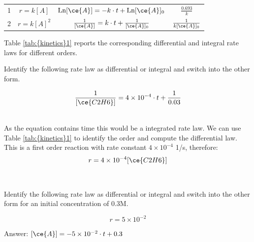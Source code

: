 \documentclass[main.tex]{subfiles}
\newcommand\chapterlabel{kinetics}
\begin{document}
\begin{description}
\begin{center}
\begin{tabular}{llll}
 1	& \multicolumn{1}{c}{	$r=k[A]$	}&\multicolumn{1}{c}{$	\text{Ln}[\ce{A}]=-k\cdot t+\text{Ln}[\ce{A}]_0	$	} &\multicolumn{1}{c}{$\frac{0.693}{k}$	} \\ [5mm]
  2	& \multicolumn{1}{c}{	$r=k[A]^2$	}&\multicolumn{1}{c}{$	\frac{1}{[\ce{A}]}=k\cdot t +\frac{1}{[\ce{A}]_0}$	} &\multicolumn{1}{c}{$\frac{1}{k[\ce{A}]_0}$	} \\ [5mm]
 \bottomrule
\end{tabular}\end{center} 
Table \ref{tab:{\chapterlabel}1} reports the corresponding differential and integral rate laws for different orders.
\begin{example} %
Identify the following rate law as differential or integral and switch into the other form.
\begin{center}\[\frac{1}{[\ce{C2H6}]}=4\times 10^{-4}\cdot t +\frac{1}{0.03}\]\end{center}
\\
As the equation contains time this would be a integrated rate law. We can use Table \ref{tab:{\chapterlabel}1} to identify the order and compute the differential law. This is a first order reaction with rate constant $4\times 10^{-4}$ 1/s, therefore:
\[r=  4\times 10^{-4} [\ce{C2H6}] \]
\\\faDiamond\ \\
Identify the following rate law as differential or integral and switch into the other form for an initial concentration of 0.3M.
\begin{center}\[r=5\times 10^{-2}\]\end{center}
\flushright Answer:   $[\ce{A}] =-5\times 10^{-2}\cdot t + 0.3$
\end{example}%


\end{description}
\end{document}

